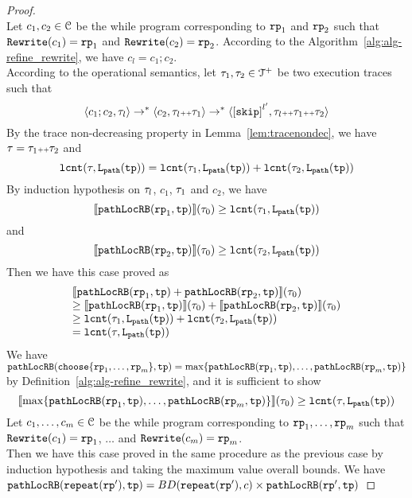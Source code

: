 \begin{proof}
\[\]
Let $c_1, c_2 \in \mathcal{C}$ be the while program corresponding to $\mathtt{rp}_1$ and $\mathtt{rp}_2$ such that $\mathtt{Rewrite}(c_1) = \mathtt{rp}_1$ and $\mathtt{Rewrite}(c_2) = \mathtt{rp}_2$.
According to the Algorithm~\ref{alg:alg-refine_rewrite}, we have $c_l = c_1; c_2$.
\\
According to the operational semantics, let $\mathtt{\tau}_1, \mathtt{\tau}_2 \in \mathcal{T}^{+}$ be two execution traces such that 
\[
  \config{c_1; c_2, \trace_l} \to^* \config{c_2, \trace_l \tracecat \trace_1} \to^* \config{\clabel{\eskip}^{l'}, \trace_l \tracecat \trace_1 \tracecat \trace_2}
\]
By the trace non-decreasing property in Lemma~\ref{lem:tracenondec}, we have $\mathtt{\tau} = \mathtt{\tau}_1 {\scriptscriptstyle ++} \mathtt{\tau}_2$ and 
\[
  \mathtt{lcnt}(\mathtt{\tau}, \mathtt{L}_{\mathtt{path}}(\mathtt{tp}))  = \mathtt{lcnt}(\mathtt{\tau}_1,  \mathtt{L}_{\mathtt{path}}(\mathtt{tp}))  + \mathtt{lcnt}(\mathtt{\tau}_2,  \mathtt{L}_{\mathtt{path}}(\mathtt{tp})) 
\]
By induction hypothesis on $\mathtt{\tau}_l$, $c_1$, $\mathtt{\tau}_1$ and $c_2$, we have
\[
  \llbracket \mathtt{pathLocRB}(\mathtt{rp}_1, \mathtt{tp}) \rrbracket(\mathtt{\tau}_0) \geq \mathtt{lcnt}(\mathtt{\tau}_1,  \mathtt{L}_{\mathtt{path}}(\mathtt{tp})) 
\]
 and 
  \[
    \llbracket \mathtt{pathLocRB}(\mathtt{rp}_2, \mathtt{tp}) \rrbracket(\mathtt{\tau}_0) \geq \mathtt{lcnt}(\mathtt{\tau}_2,  \mathtt{L}_{\mathtt{path}}(\mathtt{tp})) 
  \]
Then we have this case proved as
\[
  \begin{array}{l}
  \llbracket \mathtt{pathLocRB}(\mathtt{rp}_1, \mathtt{tp}) + \mathtt{pathLocRB}(\mathtt{rp}_2, \mathtt{tp}) \rrbracket(\mathtt{\tau}_0)
  \\
  \geq \llbracket \mathtt{pathLocRB}(\mathtt{rp}_1, \mathtt{tp}) \rrbracket(\mathtt{\tau}_0) + \llbracket \mathtt{pathLocRB}(\mathtt{rp}_2, \mathtt{tp}) \rrbracket(\mathtt{\tau}_0)
  \\
  \geq \mathtt{lcnt}(\mathtt{\tau}_1,  \mathtt{L}_{\mathtt{path}}(\mathtt{tp}))  + \mathtt{lcnt}(\mathtt{\tau}_2,  \mathtt{L}_{\mathtt{path}}(\mathtt{tp})) 
  \\
  = \mathtt{lcnt}(\mathtt{\tau}, \mathtt{L}_{\mathtt{path}}(\mathtt{tp}))
  \end{array}
  \] 
We have $\outinB(\rpchoose{\rprog_1, \ldots, \rprog_m }, \tpath) = \max\left\{ \outinB(\rprog_1, \tpath), \ldots, \outinB(\rprog_m, \tpath) \right\}$ by Definition~\ref{alg:alg-refine_rewrite}, and
it is sufficient to show
\[
  \econfig{\max\left\{ \outinB(\rprog_1, \tpath), \ldots, \outinB(\rprog_m, \tpath) \right\}}(\trace_0) \geq \lcounter(\trace, \pathl(\tpath)) 
\]
Let $c_1, \ldots, c_m \in \mathcal{C}$ be the while program corresponding to $\mathtt{rp}_1, \ldots, \mathtt{rp}_m$ such that $\mathtt{Rewrite}(c_1) = \mathtt{rp}_1$, $\ldots$ and  $\mathtt{Rewrite}(c_m) = \mathtt{rp}_m$.
\\
Then we have this case proved in the same procedure as the previous case by induction hypothesis and taking the maximum value overall bounds.
We have $\mathtt{pathLocRB}(\mathtt{repeat}(\mathtt{rp}'), \mathtt{tp}) = BD(\mathtt{repeat}(\mathtt{rp}'), c) \times \mathtt{pathLocRB}(\mathtt{rp}', \mathtt{tp})$

\end{proof}
